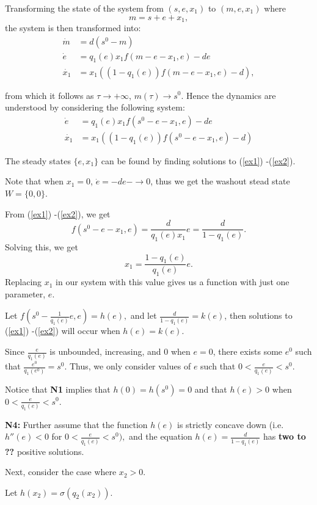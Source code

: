 \documentclass[12pt]{article}
\begin{document}
\noindent Transforming the state of the system from $(s,e,x_1)$ to $(m,e,x_1)$ where $$m=s+e+x_1,$$ the system is then transformed into: 
\begin{align*}
\dot{m}&=d(s^0-m)\\
\dot{e}&=q_1(e) x_1 f(m-e-x_1,e)-de\\
\dot{x_1} &= x_1((1-q_1(e))f(m-e-x_1,e)-d),
\end{align*}

\noindent from which it follows as $\tau \rightarrow +\infty$, $m(\tau ) \rightarrow s^0$. Hence the dynamics are understood by considering the following system: 
\begin{align}
\dot{e}&=q_1(e) x_1 f(s^0-e-x_1,e)-de\label{ex1} \\ 
\dot{x_1} &= x_1((1-q_1(e))f(s^0-e-x_1,e)-d) \label{ex2}
\end{align}

\noindent The steady states $\{e,x_1\}$ can be found by finding solutions to (\ref{ex1}) -(\ref{ex2}). 

\noindent Note that when $x_1 =0$, $\dot{e}=-de -\rightarrow 0$, thus we get the washout stead state $W=\{0,0\}$.

\noindent From (\ref{ex1}) -(\ref{ex2}), we get $$f(s^0-e-x_1,e)=\frac{d}{q_1(e)x_1}e = \frac{d}{1-q_1(e)}.$$ Solving this, we get $$x_1=\frac{1-q_1(e)}{q_1(e)}e.$$ Replacing $x_1$ in our system with this value gives us a function with just one parameter, $e$.

\noindent Let $f(s^0-\frac{1}{q_1(e)}e,e) = h(e),$ and let $\frac{d}{1-q_1(e)} = k(e)$, then solutions to (\ref{ex1}) -(\ref{ex2}) will occur when $h(e)=k(e).$

\noindent Since $\frac{e}{q_1(e)}$ is unbounded, increasing, and 0 when $e=0$, there exists some $e^0$ such that $\frac{e^0}{q_1(e^0)}=s^0.$ Thus, we only consider values of $e$ such that $0<\frac{e}{q_1(e)}<s^0.$

\noindent Notice that \textbf{N1} implies that $h(0)=h(s^0)=0$ and that $h(e)>0$ when $0<\frac{e}{q_1(e)}<s^0.$

\noindent \textbf{N4:} Further assume that the function $h(e)$ is strictly concave down (i.e. $h''(e)<0$ for $0<\frac{e}{q_1(e)}<s^0),$ and the equation $h(e)=\frac{d}{1-q_1(e)}$ has \textbf{two to ??} positive solutions. 

\pagebreak

\noindent Next, consider the case where $x_2 >0.$

\noindent Let $h(x_2)=\sigma(q_2(x_2))$. 
\end{document}
